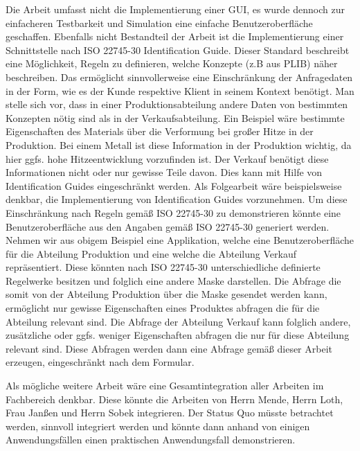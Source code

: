 Die Arbeit umfasst nicht die Implementierung einer GUI, es wurde dennoch zur einfacheren Testbarkeit und Simulation eine einfache Benutzeroberfläche geschaffen. Ebenfalls nicht Bestandteil der Arbeit ist die Implementierung einer Schnittstelle nach ISO 22745-30 Identification Guide. Dieser Standard beschreibt eine Möglichkeit, Regeln zu definieren, welche Konzepte (z.B aus \gls{PLIB}) näher beschreiben. Das ermöglicht sinnvollerweise eine Einschränkung der Anfragedaten in der Form, wie es der Kunde respektive Klient in seinem Kontext benötigt. Man stelle sich vor, dass in einer Produktionsabteilung andere Daten von bestimmten Konzepten nötig sind als in der Verkaufsabteilung. Ein Beispiel wäre bestimmte Eigenschaften des Materials über die Verformung bei großer Hitze in der Produktion. Bei einem Metall ist diese Information in der Produktion wichtig, da hier ggfs. hohe Hitzeentwicklung vorzufinden ist. Der Verkauf benötigt diese Informationen nicht oder nur gewisse Teile davon. Dies kann mit Hilfe von Identification Guides eingeschränkt werden. 
Als Folgearbeit wäre beispielsweise denkbar, die Implementierung von Identification Guides vorzunehmen. Um diese Einschränkung nach Regeln gemäß ISO 22745-30 zu demonstrieren könnte eine Benutzeroberfläche aus den Angaben gemäß ISO 22745-30 generiert werden. Nehmen wir aus obigem Beispiel eine Applikation, welche eine Benutzeroberfläche für die Abteilung Produktion und eine welche die Abteilung Verkauf repräsentiert. Diese könnten nach ISO 22745-30 unterschiedliche definierte Regelwerke besitzen und folglich eine andere Maske darstellen. Die Abfrage die somit von der Abteilung Produktion über die Maske gesendet werden kann, ermöglicht nur gewisse Eigenschaften eines Produktes abfragen die für die Abteilung relevant sind. Die Abfrage der Abteilung Verkauf kann folglich andere, zusätzliche oder ggfs. weniger Eigenschaften abfragen die nur für diese Abteilung relevant sind. Diese Abfragen werden dann eine Abfrage gemäß dieser Arbeit erzeugen, eingeschränkt nach dem Formular. 

Als mögliche weitere Arbeit wäre eine Gesamtintegration aller Arbeiten im Fachbereich denkbar. Diese könnte die Arbeiten von Herrn Mende, Herrn Loth, Frau Janßen und Herrn Sobek integrieren. Der Status Quo müsste betrachtet werden, sinnvoll integriert werden und könnte dann anhand von einigen Anwendungsfällen einen praktischen Anwendungsfall demonstrieren.   
